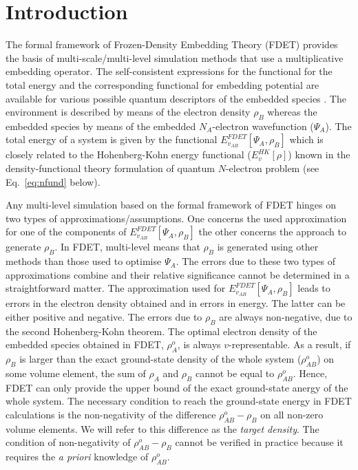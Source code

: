 \documentclass[amsmath,amssymb,preprint,aip,jcp]{revtex4-1}
\newcommand{\nr}[1]{\color{red}#1\color{black}}
\begin{document}
\section{Introduction}\label{sec:intro}
The formal framework of 
Frozen-Density Embedding Theory (FDET) provides the basis of multi-scale/multi-level simulation methods that use a multiplicative embedding operator. The self-consistent expressions for the functional for the total energy and the corresponding functional for embedding potential are available for  various possible quantum descriptors of the embedded species \cite{Wesolowski1993,Wesolowski2008,Pernal2009,Wesolowski2015,Wesolowski2020}. 
The environment is described by means of the electron density $\rho_B$ whereas the embedded species by means of the 
embedded $N_A$-electron wavefunction ($\Psi_A$). The total energy of a system is given by the functional ${E}_{v_{AB}}^{FDET}[\Psi_{A},\rho_B]$ which is closely related to the Hohenberg-Kohn energy functional ($E_v^{HK}[\rho]$) known in \nr{the } density-functional theory \cite{Hohenberg1964} formulation of quantum $N$-electron problem (see Eq.~\ref{eq:nfund} below).

Any multi-level simulation based on the formal framework of FDET
hinges on two types of approximations/assumptions.
One concerns the used approximation for one of the components of ${E}_{v_{AB}}^{FDET}[\Psi_{A},\rho_B]$ the other concerns the approach to generate $\rho_B$. In FDET, multi-level mean\nr{s } that  $\rho_B$ is generated using other methods than \nr{those } used to optimise $\Psi_A$. The errors due to these two types of approximations combine and their relative significance cannot be determined  in a straightforward matter. The approximation used for ${E}_{v_{AB}}^{FDET}[\Psi_{A},\rho_B]$ leads to errors in the electron density obtained and in errors in energy. The latter can be either positive and negative. The errors due to  $\rho_B$ are always non-negative\nr{, due to the second Hohenberg-Kohn theorem}.
The optimal electron density of the embedded species obtained in FDET\nr{, $\rho_A^o$, } is always $v$-representable. 
As a result, if $\rho_B$
is larger than the exact ground-state density of the whole system \nr{($\rho_{AB}^o$) } on some volume element, the sum of $\rho_A$ and
$\rho_B$ cannot be equal to \nr{$\rho_{AB}^o$}. \nr{Hence}, FDET can only provide the upper bound of the exact ground-state anergy of the whole system. The necessary condition to reach the ground-state energy in FDET calculations is \nr{the } non-negativity of the difference \nr{$\rho_{AB}^o-\rho_B$ } on all non-zero volume elements.
We will refer to this difference as the {\it target density}.
The condition of non-negativity of \nr{$\rho_{AB}^o-\rho_B$ }cannot be verified in practice because it requires the {\it a priori} knowledge of 
$\rho_{AB}^o$.
\end{document}
